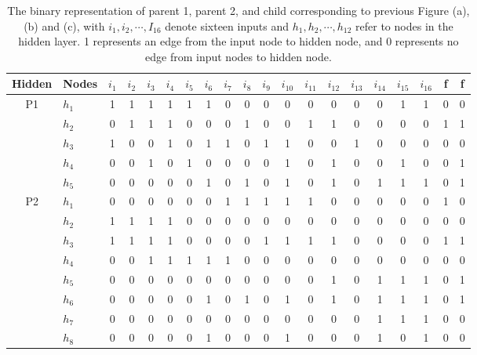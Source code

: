 \renewcommand{\arraystretch}{0.7}
\begin{table}
		\centering
		\caption{The binary representation of parent 1, parent 2, and child
			corresponding to previous Figure (a), (b) and (c), with
			$i_1,i_2,\cdots, I_{16}$ denote sixteen inputs and $h_1,h_2,
			\cdots, h_{12}$ refer to nodes in the hidden layer. 1 represents an
			edge from the input node to hidden node, and 0 represents no edge from
		input nodes to hidden node.}
		\label{tab:binary-rep}
		\begin{adjustbox}{width=0.8\textwidth}
		\begin{tabular}{cl|cccc cccc cccc cccc | cc}
			\toprule
			Hidden & Nodes  & $i_1$ & $i_2$ & $i_3$ & $i_4$ & $i_5$ & $i_6$ & $i_7$ & $i_8$ & $i_9$ & $i_{10}$ & $i_{11}$ & $i_{12}$ & $i_{13}$ & $i_{14}$ & $i								_{15}$ & $i_{16}$ & f & f\\
			\midrule
			\multirow{5}{*}{P1}		
				   &	$h_1$ & 1  & 1 & 1  & 1  & 1 & 1 & 0 & 0  & 0 & 0 & 0 & 0  & 0 & 0  & 1 & 1 & 0 & 0\\
				&	$h_2$ & 0  & 1 & 1  & 1  & 0 & 0 & 0 & 1  & 0 & 0 & 1 & 1  & 0 & 0  & 0 & 0 & 1 & 1\\
				&	$h_3$ & 1  & 0 & 0  & 1  & 0 & 1 & 1 & 0  & 1 & 1 & 0 & 0  & 1 & 0  & 0 & 0 & 0 & 0\\
				&	$h_4$ & 0  & 0 & 1  & 0  & 1 & 0 & 0 & 0  & 0 & 1 & 0 & 1  & 0 & 0  & 1 & 0 & 0 & 1\\
				&	$h_5$ & 0  & 0 & 0  & 0  & 0 & 1 & 0 & 1  & 0 & 1 & 0 & 1  & 0 & 1  & 1 & 1 & 0 & 1\\
			\midrule
			\multirow{12}{*}{P2}	
				&	$h_1$ & 0  & 0 & 0  & 0  & 0 & 0 & 1 & 1  & 1 & 1	 & 1 & 0  & 0 & 0  & 0 & 0 & 1 & 0\\
				&	$h_2$ & 1  & 1 & 1  & 1  & 0 & 0 & 0 & 0  & 0 & 0	 & 0 & 0  & 0 & 0  & 0 & 0 & 0 & 0\\
				&	$h_3$ & 1  & 1 & 1  & 1  & 0 & 0 & 0 & 0  & 1 & 1	 & 1 & 1  & 0 & 0  & 0 & 0 & 1 & 1\\
				&	$h_4$ & 0  & 0 & 1  & 1  & 1 & 1 & 1 & 0  & 0 & 0	 & 0 & 0  & 0 & 0  & 0 & 0 & 0 & 0\\
				&	$h_5$ & 0  & 0 & 0  & 0  & 0 & 0 & 0 & 0  & 0 & 0	 & 0 & 1  & 0 & 1  & 1 & 1 & 0 & 1\\
				&	$h_6$ & 0  & 0 & 0  & 0  & 0 & 1 & 0 & 1  & 0 & 1	 & 0 & 1  & 0 & 1  & 1 & 1 & 0 & 1\\
				&	$h_7$ & 0  & 0 & 0  & 0  & 0 & 0 & 0 & 0  & 0 & 0	 & 0 & 0  & 0 & 1  & 1 & 1 & 0 & 0\\
				&	$h_8$ & 0  & 0 & 0  & 0  & 0 & 1 & 0 & 0  & 0 & 1	 & 0 & 0  & 0 & 1  & 0 & 1 & 0 & 0\\

\end{tabular}
\end{adjustbox}
\end{table}
